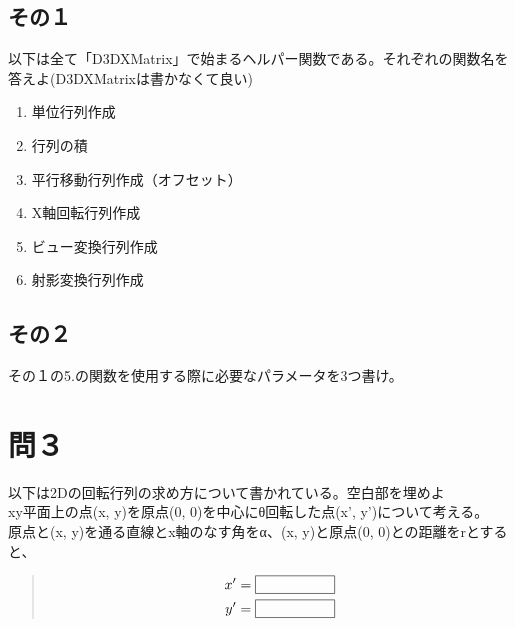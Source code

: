 \documentclass[11pt]{article}
\begin{document}
\subsection*{その１}
\label{sec:org7a0a377}
以下は全て「D3DXMatrix」で始まるヘルパー関数である。それぞれの関数名を答えよ(D3DXMatrixは書かなくて良い)\\
\begin{enumerate}
\item 単位行列作成\\
\item 行列の積\\
\item 平行移動行列作成（オフセット）\\
\item X軸回転行列作成\\
\item ビュー変換行列作成\\
\item 射影変換行列作成\\
\end{enumerate}

\subsection*{その２}
\label{sec:org816cb46}
その１の5.の関数を使用する際に必要なパラメータを3つ書け。\\


\section*{問３}
\label{sec:org1c60f83}
以下は2Dの回転行列の求め方について書かれている。空白部を埋めよ\\

xy平面上の点(x, y)を原点(0, 0)を中心にθ回転した点(x', y')について考える。\\

原点と(x, y)を通る直線とx軸のなす角をα、(x, y)と原点(0, 0)との距離をrとすると、\\

\begin{quote}
\begin{eqnarray}
x' = \boxed{\vphantom{0}\hspace{5em}}\\
y' = \boxed{\vphantom{0}\hspace{5em}}
\end{eqnarray}
\end{quote}
\end{document}
